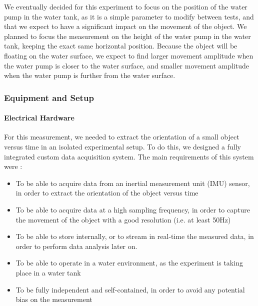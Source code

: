 \documentclass[10pt, a4paper, twocolumn]{article}
\begin{document}
We eventually decided for this experiment to focus on the position of the water pump in the water tank, as it is a simple parameter to modify between tests, and that we expect to have a significant impact on the movement of the object. We planned to focus the measurement on the height of the water pump in the water tank, keeping the exact same horizontal position. Because the object will be floating on the water surface, we expect to find larger movement amplitude when the water pump is closer to the water surface, and smaller movement amplitude when the water pump is further from the water surface. 

\subsubsection{Equipment and Setup}

\paragraph{Electrical Hardware}
For this measurement, we needed to extract the orientation of a small object versus time in an isolated experimental setup. To do this, we designed a fully integrated custom data acquisition system. The main requirements of this system were :
\begin{itemize}
    \item To be able to acquire data from an inertial measurement unit (IMU) sensor, in order to extract the orientation of the object versus time
    \item To be able to acquire data at a high sampling frequency, in order to capture the movement of the object with a good resolution (i.e. at least 50Hz)
    \item To be able to store internally, or to stream in real-time the measured data, in order to perform data analysis later on.
    \item To be able to operate in a water environment, as the experiment is taking place in a water tank
    \item To be fully independent and self-contained, in order to avoid any potential bias on the measurement
\end{itemize}
\end{document}
